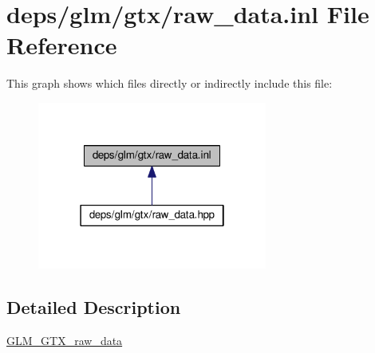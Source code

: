 \hypertarget{raw__data_8inl}{}\section{deps/glm/gtx/raw\+\_\+data.inl File Reference}
\label{raw__data_8inl}
This graph shows which files directly or indirectly include this file\+:
\nopagebreak
\begin{figure}[H]
\begin{center}
\leavevmode
\includegraphics[width=214pt]{df/d33/raw__data_8inl__dep__incl}
\end{center}
\end{figure}


\subsection{Detailed Description}
\hyperlink{group__gtx__raw__data}{G\+L\+M\+\_\+\+G\+T\+X\+\_\+raw\+\_\+data} 